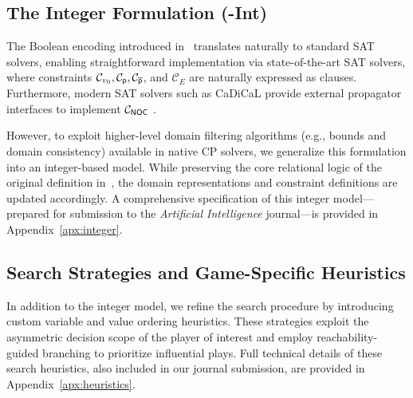 \documentclass{article}
\begin{document}
\subsection{The Integer Formulation (\nooppc-Int)}\label{sec:noc_int}

The Boolean encoding introduced in~\cite{Hernandez:2026:noc} translates naturally to standard SAT solvers, enabling straightforward implementation via state-of-the-art SAT solvers, where constraints $\mathcal{C}_{v_0}, \mathcal{C}_{\mathsf{p}}, \mathcal{C}_{\overline{\mathsf{p}}}$, and $\mathcal{C}_{E}$ are naturally expressed as clauses. Furthermore, modern SAT solvers such as CaDiCaL provide external propagator interfaces to implement $\mathcal{C}_{{\textsf{NOC}}}$ \cite{Fazekas:2023}.

However, to exploit higher-level domain filtering algorithms (e.g., bounds and domain consistency) available in native CP solvers, we generalize this formulation into an integer-based model. While preserving the core relational logic of the original definition in~\cite{Hernandez:2026:noc}, the domain representations and constraint definitions are updated accordingly. A comprehensive specification of this integer model—prepared for submission to the \textit{Artificial Intelligence} journal—is provided in Appendix~\ref{apx:integer}.

\subsection{Search Strategies and Game-Specific Heuristics}\label{sec:search_heuristics}

In addition to the integer model, we refine the search procedure by introducing custom variable and value ordering heuristics. These strategies exploit the asymmetric decision scope of the player of interest and employ reachability-guided branching to prioritize influential plays. Full technical details of these search heuristics, also included in our journal submission, are provided in Appendix~\ref{apx:heuristics}.




\end{document}

